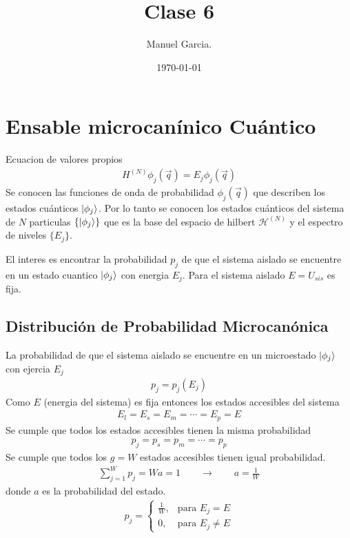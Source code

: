 \documentclass{article}
\title{Clase 6 }
\author{Manuel Garcia.}
\date{\today}
\begin{document}
\maketitle

\section{Ensable microcanínico Cuántico }
Ecuacion de valores propios 
\begin{gather*}
  H ^ {(N) } \phi_j (\vec q ) = E_j \phi_j (\vec q )
\end{gather*}
Se conocen las funciones de onda de probabilidad $ \phi_j (\vec q ) $ que describen los estados cuánticos $ \ket{\phi_j } $. Por lo tanto se conocen los estados cuánticos del sistema de $ N  $ particulas $ \{\ket{\phi_j }\} $ que es la base del espacio de hilbert $ \mathcal H ^ {(N) } $ y el espectro de niveles $ \{E_j\} $.

El interes es encontrar la probabilidad $ p_j  $ de que el sistema aislado se encuentre en un estado cuantico $ \ket{\phi_j } $ con energia $ E_j  $. Para el sistema aislado $ E= U _{sis }  $ es fija.



\subsection{Distribución de Probabilidad Microcanónica }
La probabilidad de que el sistema aislado se encuentre en un microestado $ \ket{\phi_j } $ con ejercia $ E_j  $ 
\begin{gather*}
  p_j = p_j(E_j) 
\end{gather*}
Como $ E  $ (energia del sistema) es fija entonces los estados accesibles del sistema 
\begin{gather*}
  E_l = E_s = E_m = \cdots = E_p = E  
\end{gather*}
Se cumple que todos los estados accesibles tienen la misma probabilidad 
\begin{gather*}
  p_j = p_s = p_m = \cdots = p_p  
\end{gather*}
Se cumple que todos los $ g=W  $ estados accesibles tienen igual probabilidad.
\begin{gather*}
  \displaystyle\sum_{j=1 }^{W }p_j = Wa = 1 \qquad \rightarrow \qquad a = \frac{1}{W } 
\end{gather*}
donde $ a  $ es la probabilidad del estado.
\begin{gather*}
  p_j =\left\{
    \begin{array}{lr}
      \frac{1}{W}, &\text{para } E_j = E \\
      0, &\text{para } E_j \neq E
    \end{array}
\right. 
\end{gather*}
\end{document}
